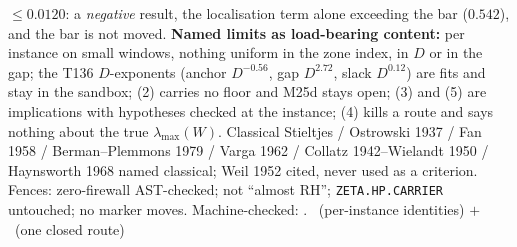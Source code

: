 $\le0.0120$: a \emph{negative} result, the localisation term alone exceeding the
bar ($0.542$), and the bar is not moved.
\textbf{Named limits as load-bearing content:} per instance on small windows,
nothing uniform in the zone index, in $D$ or in the gap; the T136 $D$-exponents
(anchor $D^{-0.56}$, gap $D^{2.72}$, slack $D^{0.12}$) are fits and stay in the
sandbox; (2) carries no floor and M25d stays open; (3) and (5) are implications
with hypotheses checked at the instance; (4) kills a route and says nothing about
the true $\lambda_{\max}(W)$. Classical Stieltjes / Ostrowski 1937 / Fan 1958 /
Berman--Plemmons 1979 / Varga 1962 / Collatz 1942--Wielandt 1950 /
Haynsworth 1968 named classical; Weil 1952 cited, never used as a criterion.
Fences: zero-firewall AST-checked; not ``almost RH'';
\texttt{ZETA.HP.CARRIER} untouched; no marker moves.
Machine-checked: .
\mE\ (per-instance identities) $+$ \mX\ (one closed route)


